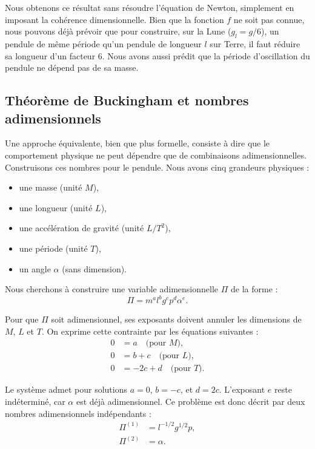 Nous obtenons ce résultat sans résoudre l’équation de Newton, simplement en imposant la cohérence dimensionnelle. Bien que la fonction $f$ ne soit pas connue, nous pouvons déjà prévoir que pour construire, sur la Lune ($g_l = g/6$), un pendule de même période qu’un pendule de longueur $l$ sur Terre, il faut réduire sa longueur d’un facteur 6. Nous avons aussi prédit que la période d’oscillation du pendule ne dépend pas de sa masse.

\subsection{Théorème de Buckingham et nombres adimensionnels}
Une approche équivalente, bien que plus formelle, consiste à dire que le comportement physique ne peut dépendre que de combinaisons adimensionnelles. Construisons ces nombres pour le pendule. Nous avons cinq grandeurs physiques :
\begin{itemize}
  \item une masse (unité $M$),
  \item une longueur (unité $L$),
  \item une accélération de gravité (unité $L/T^2$),
  \item une période (unité $T$),
  \item un angle $\alpha$ (sans dimension).
\end{itemize}

Nous cherchons à construire une variable adimensionnelle $\Pi$ de la forme :
\begin{displaymath}
  \Pi = m^a l^b g^c p^d \alpha^e.
\end{displaymath}

Pour que $\Pi$ soit adimensionnel, ses exposants doivent annuler les dimensions de $M$, $L$ et $T$. On exprime cette contrainte par les équations suivantes :
\begin{equation}
  \begin{split}
    0 &= a \quad \text{(pour $M$)}, \\
    0 &= b + c \quad \text{(pour $L$)}, \\
    0 &= -2c + d \quad \text{(pour $T$)}.
  \end{split}
  \label{eq:dimensional_system}
\end{equation}

Le système admet pour solutions $a = 0$, $b = -c$, et $d = 2c$. L’exposant $e$ reste indéterminé, car $\alpha$ est déjà adimensionnel. Ce problème est donc décrit par deux nombres adimensionnels indépendants :
\begin{equation}
  \begin{split}
    \Pi^{(1)} &= l^{-1/2} g^{1/2} p, \\
    \Pi^{(2)} &= \alpha.
  \end{split}
  \label{eq:pendule_adim}
\end{equation}

